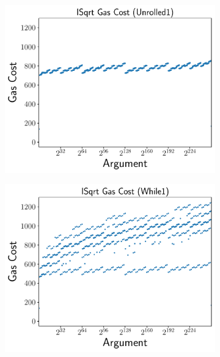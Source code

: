 \begin{figure}[p]
\centering
    \begin{subfigure}[t]{0.45\textwidth}
    \includegraphics[width=\textwidth]{plots/plot_Unrolled1.pdf}
    \end{subfigure}
    \begin{subfigure}[t]{0.45\textwidth}
    \includegraphics[width=\textwidth]{plots/plot_While1.pdf}
    \end{subfigure}


\end{figure}
